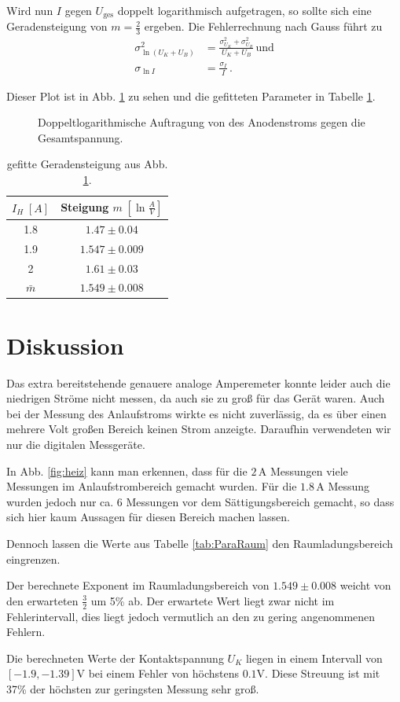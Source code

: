 \documentclass[12pt,a4paper,titlepage,headinclude,bibtotoc]{scrartcl}
\begin{document}
Wird nun $I$ gegen $U_\text{ges}$ doppelt logarithmisch aufgetragen, so sollte sich eine Geradensteigung von $m=\frac{2}{3}$ ergeben.
Die Fehlerrechnung nach Gauss führt zu
\begin{align}
\sigma_{\ln\left( U_K + U_B \right)}^2 &= \frac{\sigma_{U_K}^2 + \sigma_{U_B}^2}{U_K + U_B}\, \text{und}\\
\sigma_{\ln I} &= \frac{\sigma_I}{I}\,.
\end{align}

Dieser Plot ist in Abb. \ref{fig:expRauml} zu sehen und die gefitteten Parameter in Tabelle \ref{tab:expPara}.

\begin{figure}[!h]
\centering

\caption{Doppeltlogarithmische Auftragung von des Anodenstroms gegen die Gesamtspannung.}
\label{fig:expRauml}
\end{figure}

\begin{table}
\centering
\begin{tabular}{|c|c|}
\hline
$I_H\; [A]$	& Steigung $m\;[\ln\frac{A}{V}]$\\\hline\hline
1.8	& $1.47 \pm 0.04$	\\\hline
1.9	& $1.547 \pm 0.009$	\\\hline
2	& $1.61 \pm 0.03$	\\\hline\hline
$\bar{m}$ & $1.549 \pm 0.008$\\\hline
\end{tabular}
\caption{gefitte Geradensteigung aus Abb. \ref{fig:expRauml}.}
\label{tab:expPara}
\end{table}

\section{Diskussion}
\label{sec:diskussion}
Das extra bereitstehende genauere analoge Amperemeter konnte leider auch die niedrigen Ströme nicht messen, da auch sie zu groß für das Gerät waren.
Auch bei der Messung des Anlaufstroms wirkte es nicht zuverlässig, da es über einen mehrere Volt großen Bereich keinen Strom anzeigte.
Daraufhin verwendeten wir nur die digitalen Messgeräte.

In Abb. \ref{fig:heiz} kann man erkennen, dass für die $2\,$A Messungen viele Messungen im Anlaufstrombereich gemacht wurden.
Für die $1.8\,$A Messung wurden jedoch nur ca. 6 Messungen vor dem Sättigungsbereich gemacht, so dass sich hier kaum Aussagen für diesen Bereich machen lassen.

Dennoch lassen die Werte aus Tabelle \ref{tab:ParaRaum} den Raumladungsbereich eingrenzen.

Der berechnete Exponent im Raumladungsbereich von $1.549\pm 0.008$ weicht von den erwarteten $\frac{3}{2}$ um 5\% ab.
Der erwartete Wert liegt zwar nicht im Fehlerintervall, dies liegt jedoch vermutlich an den zu gering angenommenen Fehlern.


Die berechneten Werte der Kontaktspannung $U_K$ liegen in einem Intervall von $[-1.9,-1.39]\si\volt$ bei einem Fehler von höchstens $0.1\si\volt$.
Diese Streuung ist mit 37\% der höchsten zur geringsten Messung sehr groß.



\end{document}
